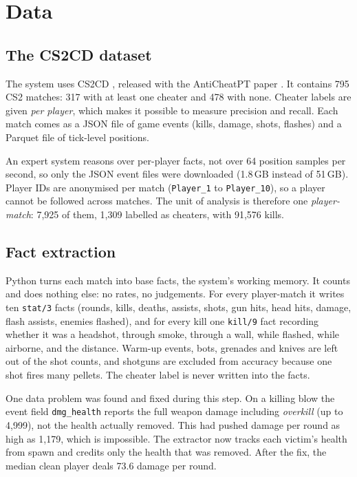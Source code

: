 \documentclass[11pt,a4paper]{article}
\newcommand{\code}[1]{\texttt{#1}}
\begin{document}
\section{Data}

\subsection{The CS2CD dataset}
The system uses CS2CD \cite{cs2cd2025}, released with the AntiCheatPT paper
\cite{anticheatpt2025}. It contains 795 CS2 matches: 317 with at least one cheater and 478 with none.
Cheater labels are given \emph{per player}, which makes it possible to measure precision and recall.
Each match comes as a JSON file of game events (kills, damage, shots, flashes) and a Parquet file of
tick-level positions.

An expert system reasons over per-player facts, not over 64 position samples per second, so only
the JSON event files were downloaded (1.8\,GB instead of 51\,GB). Player IDs are anonymised per match
(\code{Player\_1} to \code{Player\_10}), so a player cannot be followed across matches. The unit of
analysis is therefore one \emph{player-match}: 7,925 of them, 1,309 labelled as cheaters, with 91,576
kills.

\subsection{Fact extraction}
Python turns each match into base facts, the system's working memory. It counts and does nothing
else: no rates, no judgements. For every player-match it writes ten \code{stat/3} facts (rounds,
kills, deaths, assists, shots, gun hits, head hits, damage, flash assists, enemies flashed), and for
every kill one \code{kill/9} fact recording whether it was a headshot, through smoke, through a wall,
while flashed, while airborne, and the distance. Warm-up events, bots, grenades and knives are left
out of the shot counts, and shotguns are excluded from accuracy because one shot fires many pellets.
The cheater label is never written into the facts.

One data problem was found and fixed during this step. On a killing blow the event field
\code{dmg\_health} reports the full weapon damage including \emph{overkill} (up to 4,999), not the
health actually removed. This had pushed damage per round as high as 1,179, which is impossible. The
extractor now tracks each victim's health from spawn and credits only the health that was removed.
After the fix, the median clean player deals 73.6 damage per round.
\end{document}
